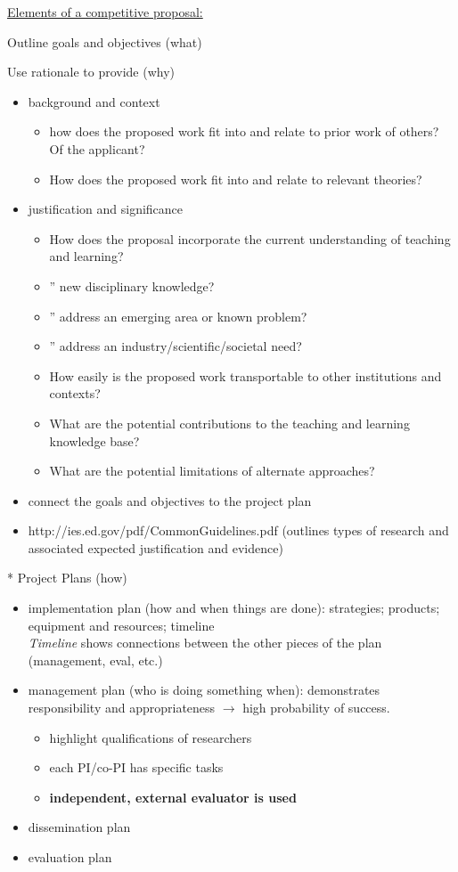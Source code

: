 \documentclass[12pt]{article}
\begin{document}
\vspace{1em}
\noindent \underline{Elements of a competitive proposal:}
\vspace{1em}

\noindent * Outline goals and objectives (what)

\vspace{1em}
\noindent * Use rationale to provide (why)
\begin{itemize}
\item background and context
  \begin{itemize}
  \item how does the proposed work fit into and relate to prior
        work of others? Of the applicant?
  \item How does the proposed work fit into and relate to relevant
        theories?
  \end{itemize}
\item justification and significance
  \begin{itemize}
  \item How does the proposal incorporate the current understanding
        of teaching and learning?
  \item '' new disciplinary knowledge?
  \item '' address an emerging area or known problem?
  \item '' address an industry/scientific/societal need?
  \item How easily is the proposed work transportable to other
        institutions and contexts?
  \item What are the potential contributions to the teaching and
        learning knowledge base?
  \item What are the potential limitations of alternate approaches?
  \end{itemize}
\item connect the goals and objectives to the project plan
\item http://ies.ed.gov/pdf/CommonGuidelines.pdf (outlines types of research and associated expected justification and evidence)
\end{itemize}
* Project Plans (how)
\begin{itemize}
\item implementation plan (how and when things are done): strategies; products; equipment and resources; timeline\\
\emph{Timeline} shows connections between the other pieces of the plan (management, eval, etc.)  
\item management plan (who is doing something when): demonstrates responsibility and appropriateness $\rightarrow$ high probability of success.
 \begin{itemize}
 \item highlight qualifications of researchers
 \item each PI/co-PI has specific tasks
 \item \textbf{independent, external evaluator is used}
 \end{itemize}
\item dissemination plan
\item evaluation plan
\end{itemize}
\end{document}
